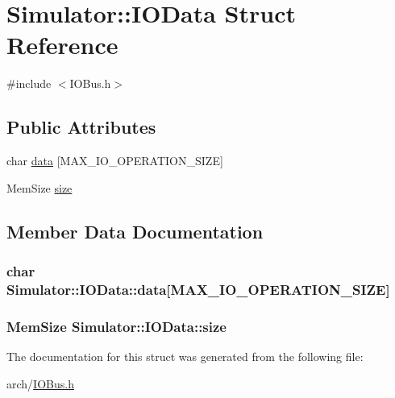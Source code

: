 \hypertarget{struct_simulator_1_1_i_o_data}{\section{Simulator\+:\+:I\+O\+Data Struct Reference}
\label{struct_simulator_1_1_i_o_data}
}


{\ttfamily \#include $<$I\+O\+Bus.\+h$>$}

\subsection*{Public Attributes}
\begin{DoxyCompactItemize}
\item 
char \hyperlink{struct_simulator_1_1_i_o_data_addeb2e33dbdd02db7581ed300c270d9b}{data} \mbox{[}M\+A\+X\+\_\+\+I\+O\+\_\+\+O\+P\+E\+R\+A\+T\+I\+O\+N\+\_\+\+S\+I\+Z\+E\mbox{]}
\item 
Mem\+Size \hyperlink{struct_simulator_1_1_i_o_data_a09c2709a4b5f5644538fa9fc1f45741a}{size}
\end{DoxyCompactItemize}


\subsection{Member Data Documentation}
\hypertarget{struct_simulator_1_1_i_o_data_addeb2e33dbdd02db7581ed300c270d9b}{
\subsubsection[{data}]{\setlength{\rightskip}{0pt plus 5cm}char Simulator\+::\+I\+O\+Data\+::data\mbox{[}M\+A\+X\+\_\+\+I\+O\+\_\+\+O\+P\+E\+R\+A\+T\+I\+O\+N\+\_\+\+S\+I\+Z\+E\mbox{]}}}\label{struct_simulator_1_1_i_o_data_addeb2e33dbdd02db7581ed300c270d9b}
\hypertarget{struct_simulator_1_1_i_o_data_a09c2709a4b5f5644538fa9fc1f45741a}{
\subsubsection[{size}]{\setlength{\rightskip}{0pt plus 5cm}Mem\+Size Simulator\+::\+I\+O\+Data\+::size}}\label{struct_simulator_1_1_i_o_data_a09c2709a4b5f5644538fa9fc1f45741a}


The documentation for this struct was generated from the following file\+:\begin{DoxyCompactItemize}
\item 
arch/\hyperlink{_i_o_bus_8h}{I\+O\+Bus.\+h}\end{DoxyCompactItemize}

